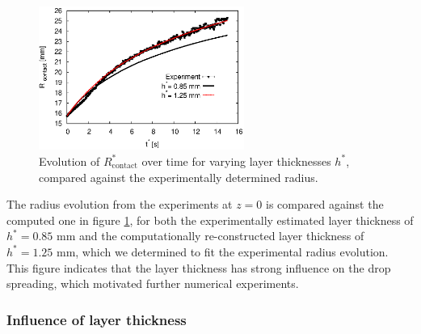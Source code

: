 \documentclass[aip,graphicx]{revtex4-1}
\newcommand{\sym}[1]{\text{#1}}
\begin{document}
\begin{figure}[!ht]
\centering
\includegraphics[width=0.6\textwidth]{figures/glucose_thick_layer_8_radius_vs_time_vary_layer.eps}
\caption{Evolution of $R^*_{\sym{contact}}$ over time for varying layer thicknesses $h^*$, compared against the experimentally determined radius.}
\label{fig:glucose_thick_layer_8_radius_vs_time_vary_layer}
\end{figure}

The radius evolution from the experiments at $z=0$ is compared against the computed one in figure \ref{fig:glucose_thick_layer_8_radius_vs_time_vary_layer}, for both the experimentally estimated layer thickness of $h^*=0.85$ mm and the computationally re-constructed layer thickness of $h^*=1.25$ mm, which we determined to fit the experimental radius evolution.
This figure indicates that the layer thickness has strong influence on the drop spreading, which motivated further numerical experiments.

\subsubsection{Influence of layer thickness}
\end{document}
